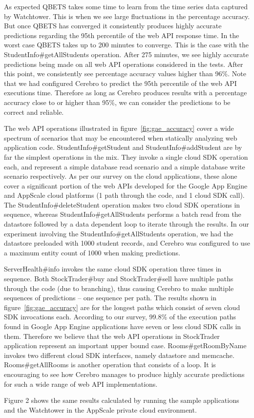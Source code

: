As expected QBETS takes some time to learn
from the time series data captured by Watchtower. This is when we see large fluctuations in the percentage accuracy. But
once QBETS has converged it consistently produces highly accurate predictions regarding the 95th percentile of the web API
response time. In the worst case QBETS takes up to 200 minutes to converge. This is the case with the
StudentInfo\#getAllStudents operation. After 275 minutes, we see highly accurate predictions being made on all web API
operations considered in the tests. After this point, we consistently see percentage accuracy values higher than 96\%. Note that
we had configured Cerebro to predict the 95th percentile of the web API executions time. Therefore as long as Cerebro produces
results with a percentage accuracy close to or higher than 95\%, we can consider the predictions to be correct and reliable.

The web API operations illustrated in figure~\ref{fig:gae_accuracy} cover a wide spectrum of scenarios that may be encountered
when statically analyzing web application code. StudentInfo\#getStudent and StudentInfo\#addStudent are by far the simplest
operations in the mix. They invoke a single cloud SDK operation each, and represent a simple database read scenario and a simple
database write scenario respectively. As per our survey on the cloud applications, these alone cover a significant portion of the 
web APIs developed for the Google App Engine and AppScale cloud platforms (1 path through the code, and 1 cloud SDK call). 
The StudentInfo\#deleteStudent operation makes two cloud SDK operations in sequence, whereas
StudentInfo\#getAllStudents performs a batch read from the datastore followed by a data dependent loop to iterate through the results.
In our experiment involving the StudentInfo\#getAllStudents operation, we had the datastore preloaded with 1000 student records, 
and Cerebro was configured to use a maximum entity count of 1000 when making predictions.

ServerHealth\#info invokes the same cloud SDK operation three times in sequence. Both StockTrader\#buy and StockTrader\#sell have
multiple paths through the code (due to branching), thus causing Cerebro to make multiple sequences of predictions -- one sequence
per path. The results shown in figure~\ref{fig:gae_accuracy} are for the longest paths which consist of seven cloud SDK invocations each. According to
our survey, 99.8\% of the execution paths found in Google App Engine applications have seven or less cloud SDK calls in them. Therefore we believe
that the web API operations in StockTrader application represent an important upper bound case. Rooms\#getRoomByName
invokes two different cloud SDK interfaces, namely datastore and memcache. Rooms\#getAllRooms is another operation that consists of
a loop. It is encouraging to see how Cerebro manages to produce highly accurate predictions for such a wide range of web API implementations.

Figure 2 shows the same results calculated by running the sample applications and the Watchtower in the AppScale private cloud
environment.